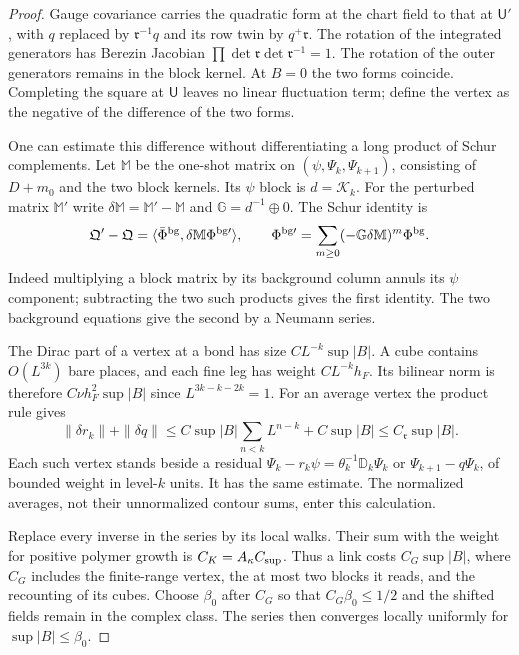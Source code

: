\documentclass[11pt,letterpaper,reqno]{amsart}
\theoremstyle{definition}
\theoremstyle{remark}
\begin{document}
\begin{proof}
Gauge covariance carries the quadratic form at the chart field
to that at $\mathsf U'$, with $q$ replaced by
$\mathfrak r^{-1}q$ and its row twin by $q^+\mathfrak r$.
The rotation of the integrated generators has Berezin Jacobian
$\prod\det\mathfrak r\det\mathfrak r^{-1}=1$.
The rotation of the outer generators remains in the block kernel.
At $B=0$ the two forms coincide.  Completing the square at
$\mathsf U$ leaves no linear fluctuation term; define the vertex
as the negative of the difference of the two forms.

One can estimate this difference without differentiating a long
product of Schur complements.  Let $\mathbb M$ be the one-shot
matrix on $(\psi,\Psi_k,\Psi_{k+1})$, consisting of $D+m_0$
and the two block kernels.  Its $\psi$ block is $d=\mathcal K_k$.
For the perturbed matrix $\mathbb M'$ write
$\delta\mathbb M=\mathbb M'-\mathbb M$ and
$\mathbb G=d^{-1}\oplus0$.  The Schur identity is
\[
 \mathfrak Q'-\mathfrak Q
   =\langle\bar\Phi^{\rm bg},\delta\mathbb M
                            \Phi^{{\rm bg}\prime}\rangle,
 \qquad
 \Phi^{{\rm bg}\prime}
     =\sum_{m\ge0}(-\mathbb G\delta\mathbb M)^m\Phi^{\rm bg}.
\]
Indeed multiplying a block matrix by its background column
annuls its $\psi$ component; subtracting the two such products
gives the first identity.  The two background equations give
the second by a Neumann series.

The Dirac part of a vertex at a bond has size
$CL^{-k}\sup|B|$.  A cube contains $O(L^{3k})$ bare places,
and each fine leg has weight $CL^{-k}h_F$.  Its bilinear norm
is therefore $C\nu h_F^2\sup|B|$ since
$L^{3k-k-2k}=1$.  For an average vertex the product rule gives
\[
 \|\delta r_k\|+\|\delta q\|
 \le C\sup|B|\sum_{n<k}L^{n-k}+C\sup|B|
 \le C_{\mathfrak r}\sup|B|.
\]
Each such vertex stands beside a residual
$\Psi_k-r_k\psi=\theta_k^{-1}\mathbb D_k\Psi_k$ or
$\Psi_{k+1}-q\Psi_k$, of bounded weight in level-$k$ units.
It has the same estimate.  The normalized averages, not their
unnormalized contour sums, enter this calculation.

Replace every inverse in the series by its local walks.
Their sum with the weight for positive polymer growth is
$C_K=A_\kappa C_{\rm sup}$.  Thus a link costs
$C_G\sup|B|$, where $C_G$ includes the finite-range vertex,
the at most two blocks it reads, and the recounting of its cubes.
Choose $\beta_0$ after $C_G$ so that $C_G\beta_0\le1/2$ and
the shifted fields remain in the complex class.  The series then
converges locally uniformly for $\sup|B|\le\beta_0$.


\end{proof}
\end{document}
